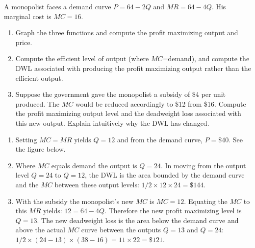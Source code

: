 \begin{enumialphparenastyle}
\begin{ex}\label{ex:ch10ex5}
A monopolist faces a demand curve $P=64-2Q$ and $MR=64-4Q$. His marginal cost is $MC=16$.
\begin{enumerate}
	\item	Graph the three functions and compute the profit maximizing output and price.
	\item	Compute the efficient level of output (where $MC$=demand), and compute the DWL associated with producing the profit maximizing output rather than the efficient output.
	\item	Suppose the government gave the monopolist a subsidy of \$4 per unit produced. The $MC$ would be reduced accordingly to \$12 from \$16. Compute the profit maximizing output level and the deadweight loss associated with this new output. Explain intuitively why the DWL has changed.
\end{enumerate}
\begin{sol}
\begin{enumerate}
	\item	Setting $MC=MR$ yields $Q=12$ and from the demand curve, $P=\$40$. See the figure below.
	\item	Where $MC$ equals demand the output is $Q=24$. In moving from the output level $Q=24$ to $Q=12$, the DWL is the area bounded by the demand curve and the $MC$ between these output levels: $1/2\times 12\times 24=\$144$.
	\item	With the subsidy the monopolist's new $MC$ is $MC=12$. Equating the $MC$ to this $MR$ yields: $12=64-4Q$. Therefore the new profit maximizing level is $Q=13$. The new deadweight loss is the area below the demand curve and above the actual $MC$ curve between the outputs $Q=13$ and $Q=24$: $1/2\times (24-13)\times(38-16)=11\times 22=\$121$.
\end{enumerate}
\begin{center}
\end{center}
\end{sol}
\end{ex}


\end{enumialphparenastyle}
